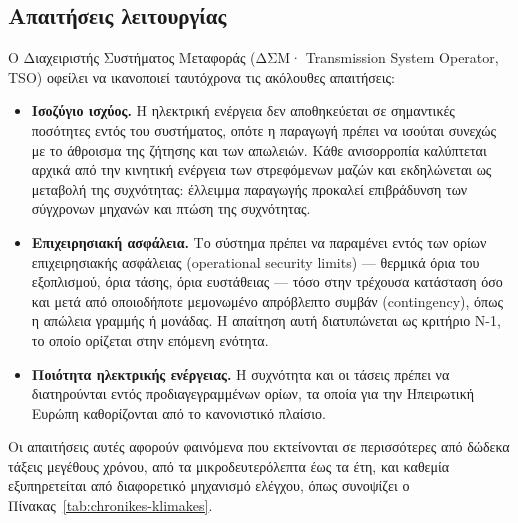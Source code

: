 \subsection{Απαιτήσεις λειτουργίας}

Ο Διαχειριστής Συστήματος Μεταφοράς (ΔΣΜ· Transmission System Operator, TSO) οφείλει να
ικανοποιεί ταυτόχρονα τις ακόλουθες απαιτήσεις:

\begin{itemize}
\item \textbf{Ισοζύγιο ισχύος.} Η ηλεκτρική ενέργεια δεν αποθηκεύεται σε σημαντικές
      ποσότητες εντός του συστήματος, οπότε η παραγωγή πρέπει να ισούται συνεχώς με το
      άθροισμα της ζήτησης και των απωλειών. Κάθε ανισορροπία καλύπτεται αρχικά από την
      κινητική ενέργεια των στρεφόμενων μαζών και εκδηλώνεται ως μεταβολή της συχνότητας:
      έλλειμμα παραγωγής προκαλεί επιβράδυνση των σύγχρονων μηχανών και πτώση της
      συχνότητας.
\item \textbf{Επιχειρησιακή ασφάλεια.} Το σύστημα πρέπει να παραμένει εντός των ορίων
      επιχειρησιακής ασφάλειας (operational security limits) — θερμικά όρια του
      εξοπλισμού, όρια τάσης, όρια ευστάθειας — τόσο στην τρέχουσα κατάσταση όσο και μετά
      από οποιοδήποτε μεμονωμένο απρόβλεπτο συμβάν (contingency), όπως η απώλεια γραμμής ή
      μονάδας. Η απαίτηση αυτή διατυπώνεται ως κριτήριο N-1, το οποίο ορίζεται στην επόμενη
      ενότητα.
\item \textbf{Ποιότητα ηλεκτρικής ενέργειας.} Η συχνότητα και οι τάσεις πρέπει να
      διατηρούνται εντός προδιαγεγραμμένων ορίων, τα οποία για την Ηπειρωτική Ευρώπη
      καθορίζονται από το κανονιστικό πλαίσιο.
\end{itemize}

Οι απαιτήσεις αυτές αφορούν φαινόμενα που εκτείνονται σε περισσότερες από δώδεκα τάξεις
μεγέθους χρόνου, από τα μικροδευτερόλεπτα έως τα έτη, και καθεμία εξυπηρετείται από
διαφορετικό μηχανισμό ελέγχου, όπως συνοψίζει ο Πίνακας~\ref{tab:chronikes-klimakes}.

